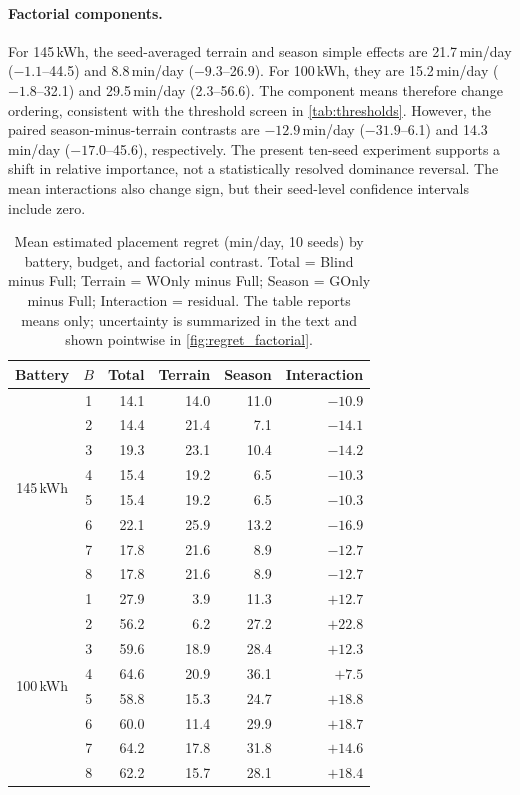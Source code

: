 \documentclass[review,3p,authoryear]{elsarticle}
\begin{document}
\paragraph{Factorial components.}
For 145\,kWh, the seed-averaged terrain and season simple effects are
21.7\,min/day ($-1.1$--44.5) and 8.8\,min/day ($-9.3$--26.9).
For 100\,kWh, they are 15.2\,min/day ($-1.8$--32.1) and
29.5\,min/day (2.3--56.6).  The component means therefore change ordering,
consistent with the threshold screen in \cref{tab:thresholds}.  However,
the paired season-minus-terrain contrasts are $-12.9$\,min/day
($-31.9$--6.1) and 14.3\,min/day ($-17.0$--45.6), respectively.
The present ten-seed experiment supports a shift in relative importance,
not a statistically resolved dominance reversal.  The mean interactions
also change sign, but their seed-level confidence intervals include zero.

\begin{table}[ht]
\centering
\caption{Mean estimated placement regret (min/day, 10 seeds) by battery,
budget, and factorial contrast.  Total = Blind minus Full; Terrain =
WOnly minus Full; Season = GOnly minus Full; Interaction = residual.
The table reports means only; uncertainty is summarized in the text and
shown pointwise in \cref{fig:regret_factorial}.}
\label{tab:regret}
\small
\begin{tabular}{ccrrrr}
\toprule
Battery & $B$ & Total & Terrain & Season & Interaction \\
\midrule
\multirow{8}{*}{145\,kWh}
 & 1 & 14.1 & 14.0 & 11.0 & $-10.9$ \\
 & 2 & 14.4 & 21.4 &  7.1 & $-14.1$ \\
 & 3 & 19.3 & 23.1 & 10.4 & $-14.2$ \\
 & 4 & 15.4 & 19.2 &  6.5 & $-10.3$ \\
 & 5 & 15.4 & 19.2 &  6.5 & $-10.3$ \\
 & 6 & 22.1 & 25.9 & 13.2 & $-16.9$ \\
 & 7 & 17.8 & 21.6 &  8.9 & $-12.7$ \\
 & 8 & 17.8 & 21.6 &  8.9 & $-12.7$ \\
\midrule
\multirow{8}{*}{100\,kWh}
 & 1 & 27.9 &  3.9 & 11.3 & $+12.7$ \\
 & 2 & 56.2 &  6.2 & 27.2 & $+22.8$ \\
 & 3 & 59.6 & 18.9 & 28.4 & $+12.3$ \\
 & 4 & 64.6 & 20.9 & 36.1 & $+7.5$  \\
 & 5 & 58.8 & 15.3 & 24.7 & $+18.8$ \\
 & 6 & 60.0 & 11.4 & 29.9 & $+18.7$ \\
 & 7 & 64.2 & 17.8 & 31.8 & $+14.6$ \\
 & 8 & 62.2 & 15.7 & 28.1 & $+18.4$ \\
\bottomrule
\end{tabular}
\end{table}
\end{document}
